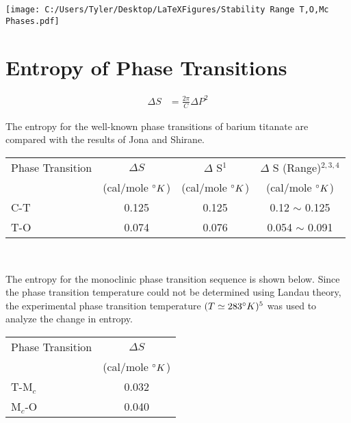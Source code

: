 \documentclass{article}
\begin{document}
\texttt{[image: C:/Users/Tyler/Desktop/LaTeXFigures/Stability Range T,O,Mc Phases.pdf]}

\newpage
\justify

\section{Entropy of Phase Transitions}
\begin{align*}
\Delta S &= \frac{2 \pi}{C}\Delta P^2
\end{align*}

The entropy for the well-known phase transitions of barium titanate are compared with the results of Jona and Shirane.
\vspace{12 pt}

\begin{tabular}{| l | c | c| c|}
     \hline
     Phase Transition &   $\Delta S$                    &   $\Delta$ S$^1$             &   $\Delta$ S (Range)$^{2,3,4}$ \\
                                &  (cal/mole $\degree K$)  & (cal/mole $\degree K$)   & (cal/mole $\degree K$)  \\ \hline
     C-T                      & 0.125                              & 0.125                            & 0.12 $ \sim $ 0.125 \\ \hline
     T-O                     & 0.074                             & 0.076                             & 0.054 $ \sim $ 0.091 \\ \hline
\end{tabular} \\

\vspace{12 pt}

The entropy for the monoclinic phase transition sequence is shown below.  Since the phase transition temperature could not be determined using Landau theory, the experimental phase transition temperature  $ (T \simeq 283 \degree K )^5 $ was used to analyze the change in entropy.
\vspace{12 pt}

 \begin{tabular}{| l |c |}
        \hline
        Phase Transition & $\Delta S$ \\
        &  (cal/mole $\degree K$) \\ \hline
         T-M$_c$ &0.032\\ \hline
         M$_c$-O & 0.040\\ \hline
\end{tabular}
\end{document}
